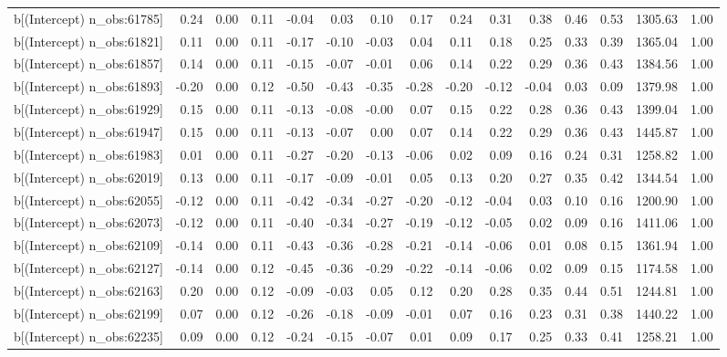\begin{table}[ht]
\begin{tabular}{rrrrrrrrrrrrrrr}
  b[(Intercept) n\_obs:61785] & 0.24 & 0.00 & 0.11 & -0.04 & 0.03 & 0.10 & 0.17 & 0.24 & 0.31 & 0.38 & 0.46 & 0.53 & 1305.63 & 1.00 \\ 
  b[(Intercept) n\_obs:61821] & 0.11 & 0.00 & 0.11 & -0.17 & -0.10 & -0.03 & 0.04 & 0.11 & 0.18 & 0.25 & 0.33 & 0.39 & 1365.04 & 1.00 \\ 
  b[(Intercept) n\_obs:61857] & 0.14 & 0.00 & 0.11 & -0.15 & -0.07 & -0.01 & 0.06 & 0.14 & 0.22 & 0.29 & 0.36 & 0.43 & 1384.56 & 1.00 \\ 
  b[(Intercept) n\_obs:61893] & -0.20 & 0.00 & 0.12 & -0.50 & -0.43 & -0.35 & -0.28 & -0.20 & -0.12 & -0.04 & 0.03 & 0.09 & 1379.98 & 1.00 \\ 
  b[(Intercept) n\_obs:61929] & 0.15 & 0.00 & 0.11 & -0.13 & -0.08 & -0.00 & 0.07 & 0.15 & 0.22 & 0.28 & 0.36 & 0.43 & 1399.04 & 1.00 \\ 
  b[(Intercept) n\_obs:61947] & 0.15 & 0.00 & 0.11 & -0.13 & -0.07 & 0.00 & 0.07 & 0.14 & 0.22 & 0.29 & 0.36 & 0.43 & 1445.87 & 1.00 \\ 
  b[(Intercept) n\_obs:61983] & 0.01 & 0.00 & 0.11 & -0.27 & -0.20 & -0.13 & -0.06 & 0.02 & 0.09 & 0.16 & 0.24 & 0.31 & 1258.82 & 1.00 \\ 
  b[(Intercept) n\_obs:62019] & 0.13 & 0.00 & 0.11 & -0.17 & -0.09 & -0.01 & 0.05 & 0.13 & 0.20 & 0.27 & 0.35 & 0.42 & 1344.54 & 1.00 \\ 
  b[(Intercept) n\_obs:62055] & -0.12 & 0.00 & 0.11 & -0.42 & -0.34 & -0.27 & -0.20 & -0.12 & -0.04 & 0.03 & 0.10 & 0.16 & 1200.90 & 1.00 \\ 
  b[(Intercept) n\_obs:62073] & -0.12 & 0.00 & 0.11 & -0.40 & -0.34 & -0.27 & -0.19 & -0.12 & -0.05 & 0.02 & 0.09 & 0.16 & 1411.06 & 1.00 \\ 
  b[(Intercept) n\_obs:62109] & -0.14 & 0.00 & 0.11 & -0.43 & -0.36 & -0.28 & -0.21 & -0.14 & -0.06 & 0.01 & 0.08 & 0.15 & 1361.94 & 1.00 \\ 
  b[(Intercept) n\_obs:62127] & -0.14 & 0.00 & 0.12 & -0.45 & -0.36 & -0.29 & -0.22 & -0.14 & -0.06 & 0.02 & 0.09 & 0.15 & 1174.58 & 1.00 \\ 
  b[(Intercept) n\_obs:62163] & 0.20 & 0.00 & 0.12 & -0.09 & -0.03 & 0.05 & 0.12 & 0.20 & 0.28 & 0.35 & 0.44 & 0.51 & 1244.81 & 1.00 \\ 
  b[(Intercept) n\_obs:62199] & 0.07 & 0.00 & 0.12 & -0.26 & -0.18 & -0.09 & -0.01 & 0.07 & 0.16 & 0.23 & 0.31 & 0.38 & 1440.22 & 1.00 \\ 
  b[(Intercept) n\_obs:62235] & 0.09 & 0.00 & 0.12 & -0.24 & -0.15 & -0.07 & 0.01 & 0.09 & 0.17 & 0.25 & 0.33 & 0.41 & 1258.21 & 1.00 \\ 

\end{tabular}
\end{table}
